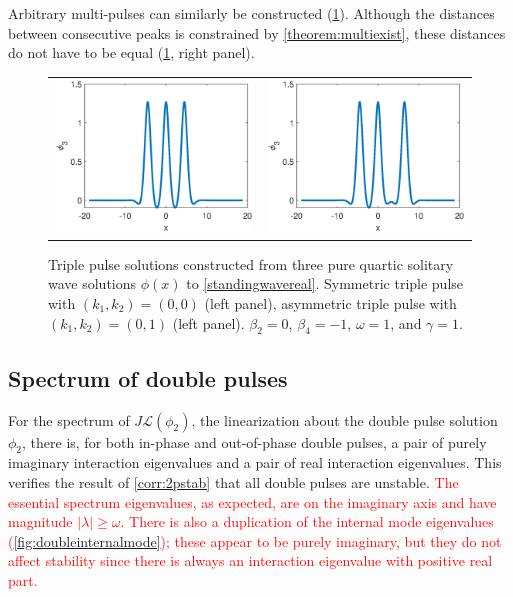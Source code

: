 \documentclass[12pt]{elsarticle}
\def\calL{{\mathcal L}}
\newcommand{\revised}[1]{ \textcolor{red}{#1} }
\begin{document}
Arbitrary multi-pulses can similarly be constructed (\cref{fig:triplepulses}). Although the distances between consecutive peaks is constrained by \cref{theorem:multiexist}, these distances do not have to be equal (\cref{fig:triplepulses}, right panel).

\begin{figure}[H]
\centering
\begin{tabular}{cc}
\includegraphics[width=8cm]{images/triple00} &
\includegraphics[width=8cm]{images/triple01}
\end{tabular}
\caption{Triple pulse solutions constructed from three pure quartic solitary wave solutions $\phi(x)$ to \cref{standingwavereal}. Symmetric triple pulse with $(k_1, k_2) = (0,0)$ (left panel), asymmetric triple pulse with $(k_1, k_2) = (0,1)$ (left panel). $\beta_2 = 0$, $\beta_4 = -1$, $\omega = 1$, and $\gamma = 1$. }
\label{fig:triplepulses}
\end{figure} 

\subsection{Spectrum of double pulses}

For the spectrum of $J \calL(\phi_2)$, the linearization about the double pulse solution $\phi_2$, there is, for both in-phase and out-of-phase double pulses, a pair of purely imaginary interaction eigenvalues and a pair of real interaction eigenvalues. This verifies the result of \cref{corr:2pstab} that all double pulses are unstable. \revised{The essential spectrum eigenvalues, as expected, are on the imaginary axis and have magnitude $|\lambda| \geq \omega$. There is also a duplication of the internal mode eigenvalues (\cref{fig:doubleinternalmode}); these appear to be purely imaginary, but they do not affect stability since there is always an interaction eigenvalue with positive real part.}
\end{document}
